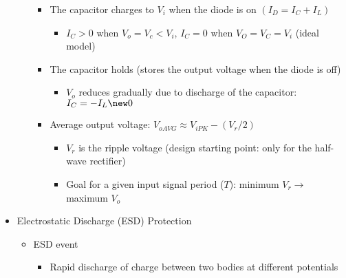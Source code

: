\begin{itemize}
\begin{itemize}
\begin{itemize}
          \item The capacitor charges to $V_i$ when the diode is on $(I_D=I_C+I_L)$

            \begin{itemize}

              \item $I_C>0$ when $V_o=V_c<V_i$, $I_C=0$ when $V_O=V_C=V_i$ (ideal model)

            \end{itemize}

          \item The capacitor holds (stores the output voltage when the diode is off)

              \begin{itemize}

                \item $V_o$ reduces gradually due to discharge of the capacitor: $I_C=-I_L\new 0$

              \end{itemize}

            \item Average output voltage: $V_{oAVG}\approx V_{iPK}- (V_r/2)$

              \begin{itemize}

                \item $V_r$ is the ripple voltage (design starting point: only for the half-wave rectifier)

                \item Goal for a given input signal period ($T$): minimum $V_r\to$ maximum $V_o$

              \end{itemize}

        \end{itemize}

    \end{itemize}

  \item Electrostatic Discharge (ESD) Protection

    \begin{itemize}
        
      \item ESD event

        \begin{itemize}

          \item Rapid discharge of charge between two bodies at different potentials


\end{itemize}
\end{itemize}
\end{itemize}
